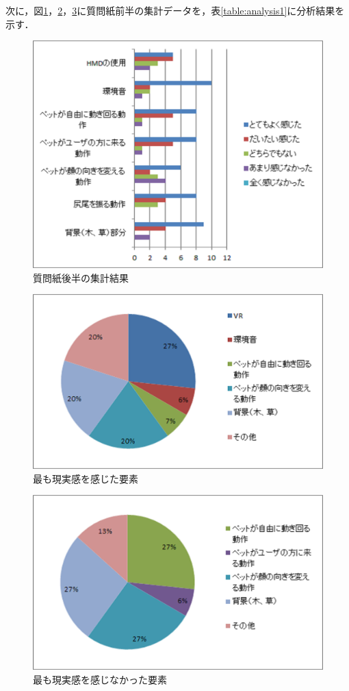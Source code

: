次に，図\ref{fig:chart2}，\ref{fig:chart3}，\ref{fig:chart4}に質問紙前半の集計データを，表\ref{table:analysis1}に分析結果を示す．

\begin{figure}[H]
\centering
\includegraphics*[width=12cm,clip]{images/graphic2.eps}
\caption{質問紙後半の集計結果}
\label{fig:chart2}
\end{figure} 

\begin{figure}[H]
\centering
\includegraphics*[width=13cm,clip]{images/graphic4.eps}
\caption{最も現実感を感じた要素}
\label{fig:chart3}
\end{figure} 

\begin{figure}[H]
\centering
\includegraphics*[width=13cm,clip]{images/graphic3.eps}
\caption{最も現実感を感じなかった要素}
\label{fig:chart4}
\end{figure} 

